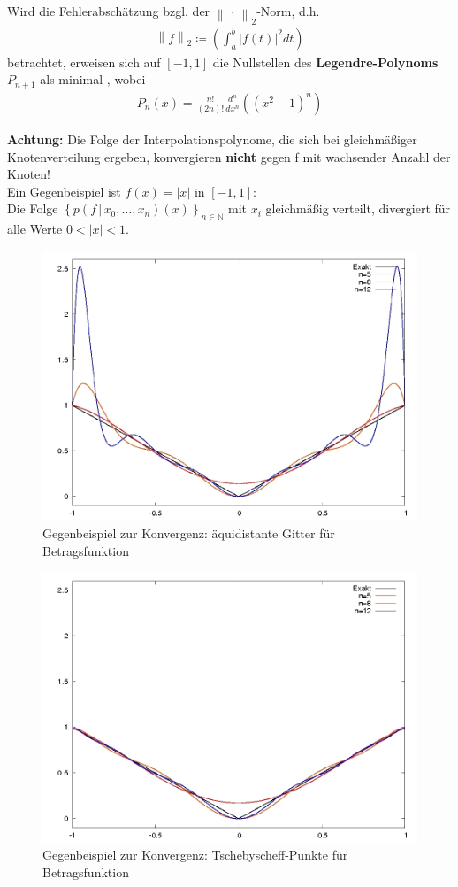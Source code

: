 \documentclass[ngerman,fontsize=11pt, paper=a4, parskip=half, titlepage=true, toc=bib]{scrbook}
\theoremstyle{definition}
\theoremstyle{plain}
\newcommand{\N}{\mathds{N}}
\newcommand{\nn}[1]{\left\| #1 \right\|}	%
\begin{document}
Wird die Fehlerabschätzung bzgl. der 
$\nn{\,\cdot\,}_2$-Norm,
d.h. 
\begin{gather*}
  \nn{f}_2\coloneqq \left(\int_{a}^{b}|f(t)|^2dt  \right)
\end{gather*}
betrachtet, erweisen sich auf $[-1,1]$ die Nullstellen
des \textbf{Legendre-Polynoms} $P_{n+1}$
als minimal \cite{haemmerlinhoffmann}, wobei
\begin{gather*}
  P_n(x) = \frac{n!}{(2n)!}\frac{d^n}{dx^n}\left((x^2-1)^n\right)
\end{gather*}


\textbf{Achtung:} Die Folge der Interpolationspolynome,
die sich bei gleichmäßiger Knotenverteilung ergeben,
konvergieren \textbf{nicht} gegen f mit wachsender Anzahl der Knoten!\\
Ein Gegenbeispiel ist $f(x)=|x|$ in $[-1,1]$:\\
Die Folge $\left\{p(f\,|\,x_0,\dots,x_n)(x)\right\}_{n\in\N}$
mit $x_i$ gleichmäßig verteilt,
divergiert für alle Werte $0<|x|<1$.

\begin{figure}
	\centering
	\includegraphics[width=0.5\linewidth]{images/afg49aequi.jpg}
	\caption{Gegenbeispiel zur Konvergenz: äquidistante Gitter für Betragsfunktion}
	\label{6.1.20im1}
\end{figure}
\begin{figure}[t!b]
	\centering
	\includegraphics[width=0.5\linewidth]{images/afg49tscheby.jpeg}
	\caption{Gegenbeispiel zur Konvergenz: Tschebyscheff-Punkte für Betragsfunktion}
	\label{6.1.20im2}
\end{figure}
\end{document}
